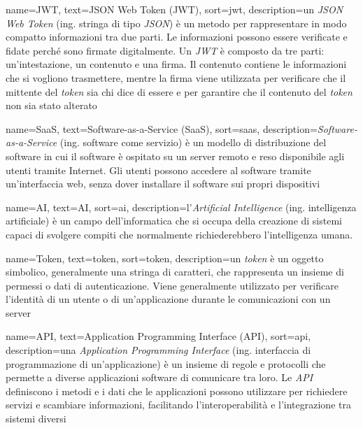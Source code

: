  {
    name=JWT,
    text=JSON Web Token (JWT),
    sort=jwt,
    description={un \emph{JSON Web Token} (ing. stringa di tipo \emph{JSON}) è un metodo per rappresentare in modo compatto informazioni tra due parti. Le informazioni possono essere verificate e fidate perché sono firmate digitalmente. Un \emph{JWT} è composto da tre parti: un'intestazione, un contenuto e una firma. Il contenuto contiene le informazioni che si vogliono trasmettere, mentre la firma viene utilizzata per verificare che il mittente del \emph{token} sia chi dice di essere e per garantire che il contenuto del \emph{token} non sia stato alterato}
}

 {
    name=SaaS,
    text=Software-as-a-Service (SaaS),
    sort=saas,
    description={\emph{Software-as-a-Service} (ing. software come servizio) è un modello di distribuzione del software in cui il software è ospitato su un server remoto e reso disponibile agli utenti tramite Internet. Gli utenti possono accedere al software tramite un'interfaccia web, senza dover installare il software sui propri dispositivi}
}

 {
    name=AI,
    text=AI,
    sort=ai,
    description={l'\emph{Artificial Intelligence} (ing. intelligenza artificiale) è un campo dell'informatica che si occupa della creazione di sistemi capaci di svolgere compiti che normalmente richiederebbero l'intelligenza umana.}
}

 {
    name=Token,
    text=token,
    sort=token,
    description={un \emph{token} è un oggetto simbolico, generalmente una stringa di caratteri, che rappresenta un insieme di permessi o dati di autenticazione. Viene generalmente utilizzato per verificare l'identità di un utente o di un'applicazione durante le comunicazioni con un server}
}

 {
    name=API,
    text=Application Programming Interface (API),
    sort=api,
    description={una \emph{Application Programming Interface} (ing. interfaccia di programmazione di un'applicazione) è un insieme di regole e protocolli che permette a diverse applicazioni software di comunicare tra loro. Le \emph{API} definiscono i metodi e i dati che le applicazioni possono utilizzare per richiedere servizi e scambiare informazioni, facilitando l'interoperabilità e l'integrazione tra sistemi diversi}
}

